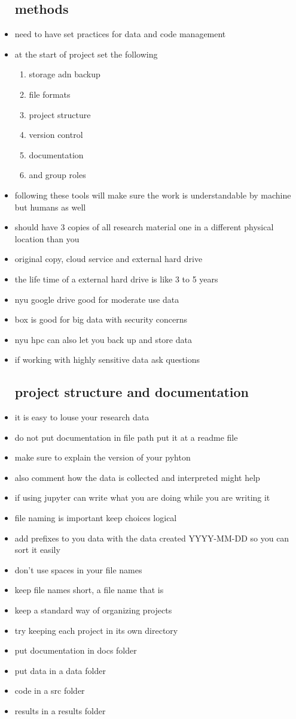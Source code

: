 \documentclass{article}
\begin{document}
\begin{itemize}
\subsection*{methods }
\item need to have set practices for data and code management
\item at the start of project set the following 
\begin{enumerate}
    \item storage adn backup 
    \item file formats 
    \item project structure 
    \item version control 
    \item documentation 
    \item and group roles
\end{enumerate}
\item following these tools will make sure the work is understandable by machine but humans as well 
\item should have 3 copies of all research material one in a different physical location than you 
\item original copy, cloud service and external hard drive 
\item the life time of a external hard drive is like 3 to 5 years 
\item nyu google drive good for moderate use data 
\item box is good for big data with security concerns 
\item nyu hpc can also let you back up and store data 
\item if working with highly sensitive data ask questions 
\subsection*{project structure and documentation}
\item it is easy to louse your research data 
\item do not put documentation in file path put it at a readme file 
\item make sure to explain the version of your pyhton 
\item also comment how the data is collected and interpreted might help
\item if using jupyter can write what you are doing while you are writing it
\item file naming is important keep choices logical 
\item add prefixes to you data with the data created YYYY-MM-DD so you can sort it easily
\item don't use spaces in your file names 
\item keep file names short, a file name that is   
\item keep a standard way of organizing projects 
\item try keeping each project in its own directory
\item put documentation in docs folder 
\item put data in a data folder 
\item code in a src folder 
\item results in a results folder 

\end{itemize}
\end{document}
